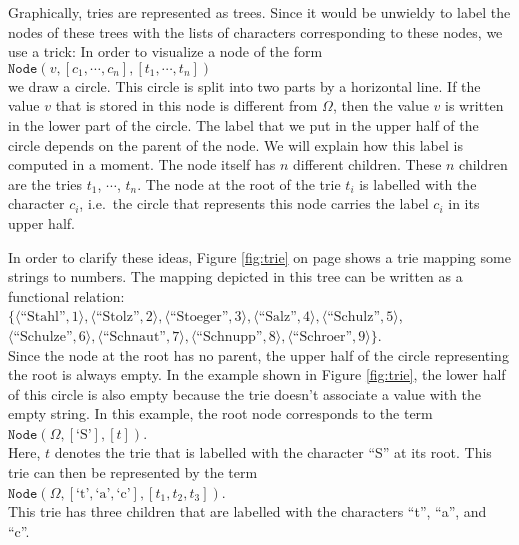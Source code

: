 Graphically, tries are represented as trees.  Since it would be unwieldy to label the nodes of these
trees with the lists of characters corresponding to these nodes, we use a trick:  In order to
visualize a node of the form \\[0.2cm]
\hspace*{1.3cm} 
$\mathtt{Node}(v, [c_1, \cdots, c_n], [t_1, \cdots, t_n])$ \\[0.2cm]
we draw a circle.  This circle is split into two parts by a horizontal line.
If the value  $v$ that is stored in this node is different from $\Omega$, then the value $v$ is
written in the lower part of the circle.  The label that we put in the upper half of the circle
depends on the parent of the node.  We will explain how this label is computed in a moment.
The node itself has $n$ different children.  These $n$ children are the tries
$t_1$, $\cdots$, $t_n$.  The node at the root of the trie $t_i$ is labelled with the character $c_i$,
i.e.~the circle that represents this node carries the label $c_i$ in its upper half.

In order to clarify these ideas, Figure  \ref{fig:trie} on page \pageref{fig:trie} shows a trie
mapping some strings to numbers.  The mapping depicted in this tree can be written as a functional
relation: 
\\[0.2cm]
\hspace*{1.3cm} $ \bigl\{ \langle \textrm{``Stahl''},   1  \rangle, \langle \textrm{``Stolz''},     2  \rangle, \langle \textrm{``Stoeger''},   3  \rangle, 
             \langle \textrm{``Salz''},      4  \rangle, \langle \textrm{``Schulz''},    5  \rangle$, \\[0.2cm]
\hspace*{1.5cm} $\langle \textrm{``Schulze''},   6  \rangle, \langle \textrm{``Schnaut''},   7  \rangle, 
  \langle \textrm{``Schnupp''},   8  \rangle, 
  \langle \textrm{``Schroer''},   9  \rangle\}$. \\[0.2cm]
Since the node at the root has no parent, the upper half of  the circle representing the root is
always empty.  In the example shown in Figure \ref{fig:trie}, the lower half of this circle is also empty
because the trie doesn't associate a value with the empty string.  In this example, the root node corresponds
to the term  
\\[0.2cm]
\hspace*{1.3cm}
 $\mathtt{Node}(\Omega,[\textrm{`S'}], [t])$. 
\\[0.2cm]
Here,  $t$ denotes the trie that is labelled with the character  ``S'' at its root.
This trie can then be represented by the term  \\[0.2cm]
\hspace*{1.3cm} 
$\mathtt{Node}(\Omega,[\textrm{`t'},\textrm{`a'},\textrm{`c'}], [t_1, t_2, t_3])$. \\[0.2cm]
This trie has three children that are labelled with the characters  ``t'', ``a'', and ``c''.

